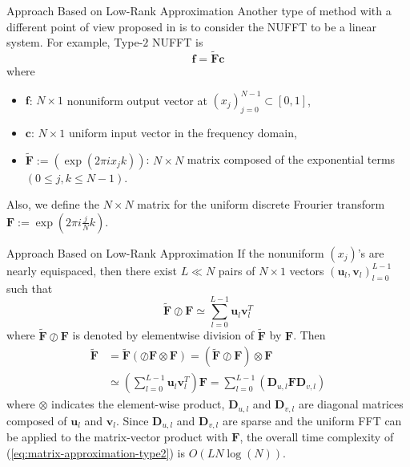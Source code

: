 \documentclass{beamer}
\begin{document}
\begin{frame}{Approach Based on Low-Rank Approximation}
  Another type of method with a different point of view proposed in \cite{SISC-2018-Townsend}
  is to consider the NUFFT to be a linear system. For example, Type-$2$ NUFFT is 
  \begin{equation}
    \bm{f} = \tilde{\bm{F}}\bm{c}
    \label{eq:matrix-vector-product-nufft-type-2}
  \end{equation}
  where
  \begin{itemize}
    \item $\bm{f}$: $N \times 1$ nonuniform output vector at $(x_j)_{j=0}^{N-1} \subset [0, 1]$, 
    \item $\bm{c}$: $N \times 1$ uniform input vector in the frequency domain,
    \item $\tilde{\bm{F}} := \left(\exp(2\pi i x_{j}k)\right)$: $N \times N$ matrix composed of the exponential terms
    $(0 \le j, k \le N-1)$.
  \end{itemize}
  Also, we define the $N \times N$ matrix for the uniform discrete Frourier transform
  $\bm{F} := \exp(2\pi i \frac{j}{N}k)$.
\end{frame}

\begin{frame}{Approach Based on Low-Rank Approximation}
  If the nonuniform $(x_j)$'s are nearly equispaced, then there exist $L \ll N$ pairs of $N \times 1$
  vectors $(\bm{u}_l, \bm{v}_l)_{l=0}^{L-1}$ such that
  \begin{equation}
    \bm{\tilde{F}}\oslash\bm{F} \simeq
    \sum_{l=0}^{L-1}\bm{u}_{l}\bm{v}_{l}^{T}
  \end{equation}
  where $\tilde{\bm{F}}\oslash\bm{F}$ is denoted by elementwise division of $\tilde{\bm{F}}$ by $\bm{F}$. Then
  \begin{align}
       \tilde{\bm{F}}
    &= \tilde{\bm{F}}\left(\oslash\bm{F}\otimes\bm{F}\right)
     = \left(\tilde{\bm{F}}\oslash\bm{F}\right)\otimes\bm{F} \\
    &\simeq \left(\sum_{l=0}^{L-1}\bm{u}_{l}\bm{v}_{l}^{T}\right)\bm{F} 
     = \sum_{l=0}^{L-1}\left(\bm{D}_{u,l}\bm{F}\bm{D}_{v,l}\right)
    \label{eq:matrix-approximation-type2}
  \end{align}
  where $\otimes$ indicates the element-wise product,
  $\bm{D}_{u,l}$ and $\bm{D}_{v,l}$ are diagonal matrices composed of $\bm{u}_{l}$ and $\bm{v}_{l}$.
  Since $\bm{D}_{u,l}$ and $\bm{D}_{v,l}$ are sparse and the uniform FFT can be applied to the matrix-vector product with $\bm{F}$, the overall time complexity of (\ref{eq:matrix-approximation-type2})
  is $O(L N \log(N))$.
\end{frame}
\end{document}
